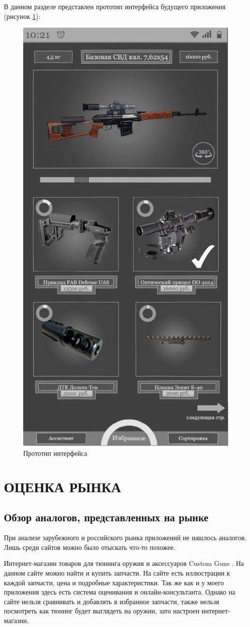 \documentclass[14pt]{extreport}
\begin{document}
В данном разделе представлен прототип интерфейса будущего приложения (рисунок \ref{fig1}):

\begin{figure}[H]
\centerline{\includegraphics[width=0.55\linewidth]{pic}}
\caption{Прототип интерфейса}
\label{fig1}
\end{figure}


\chapter{ОЦЕНКА РЫНКА\label{chapter2}}
\section{Обзор аналогов, представленных на рынке}

При анализе зарубежного и российского рынка приложений не нашлось аналогов. Лишь среди сайтов можно было отыскать что-то похожее.

Интернет-магазин товаров для тюнинга оружия и аксессуаров Custom Guns \cite{bib1}. На данном сайте можно найти и купить запчасти. На сайте есть иллюстрации к каждой запчасти, цена и подробные характеристики. Так же как и у моего приложения здесь есть система оценивания и онлайн-консультанта. Однако на сайте нельзя сравнивать и добавлять в избранное запчасти, также нельзя посмотреть как тюнинг будет выглядеть на оружии, зато настроен интернет-магазин.
\end{document}
